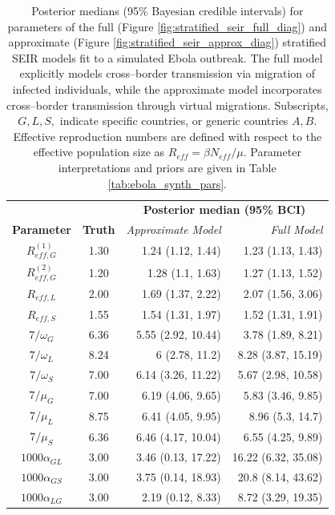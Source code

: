 \begin{table}[htbp]
	\caption[Posterior parameter estimates for full and approximate stratified SEIR models fit to a simulated Ebola outbreak.]{Posterior medians (95\% Bayesian credible intervals) for parameters of the full (Figure \ref{fig:stratified_seir_full_diag}) and approximate (Figure \ref{fig:stratified_seir_approx_diag}) stratified SEIR models fit to a simulated Ebola outbreak. The full model explicitly models cross--border transmission via migration of infected individuals, while the approximate model incorporates cross--border transmission through virtual migrations. Subscripts, $ G,L,S, $ indicate specific countries, or generic countries $ A,B $. Effective reproduction numbers are defined with respect to the effective population size as $ R_{eff} = \beta N_{eff} /\mu $. Parameter interpretations and priors are given in Table \ref{tab:ebola_synth_pars}.}
	\label{tab:ebola_synth_ests}
	\centering\footnotesize
	\begin{tabular}{ccrr}		
		\hline
		& & \multicolumn{2}{c}{\textbf{Posterior median (95\% BCI)}}\\\cline{3-4}
		\textbf{Parameter} & \textbf{Truth} & \textit{Approximate Model} & \textit{Full Model} \\ 
		\hline
		$ R_{eff,G}^{(1)} $& 1.30 & 1.24 (1.12, 1.44) & 1.23 (1.13, 1.43) \\ 
		$ R_{eff,G}^{(2)} $& 1.20 & 1.28 (1.1, 1.63)& 1.27 (1.13, 1.52) \\ 
		$ R_{eff,L} $& 2.00 & 1.69 (1.37, 2.22) & 2.07 (1.56, 3.06)  \\ 
		$ R_{eff,S} $& 1.55 & 1.54 (1.31, 1.97)& 1.52 (1.31, 1.91) \\ 
		$ 7/\omega_G $& 6.36 & 5.55 (2.92, 10.44)& 3.78 (1.89, 8.21)  \\ 
		$ 7/\omega_L $& 8.24 & 6 (2.78, 11.2)&  8.28 (3.87, 15.19) \\ 
		$ 7/\omega_S $& 7.00 & 6.14 (3.26, 11.22)& 5.67 (2.98, 10.58) \\ 
		$ 7/\mu_G $& 7.00 & 6.19 (4.06, 9.65)& 5.83 (3.46, 9.85) \\ 
		$ 7/\mu_L $ & 8.75 & 6.41 (4.05, 9.95) & 8.96 (5.3, 14.7) \\
		$ 7/\mu_S $& 6.36 & 6.46 (4.17, 10.04)& 6.55 (4.25, 9.89) \\ 
		$ 1000\alpha_{GL} $& 3.00 & 3.46 (0.13, 17.22) & 16.22 (6.32, 35.08) \\ 
		$ 1000\alpha_{GS} $& 3.00 & 3.75 (0.14, 18.93)& 20.8 (8.14, 43.62) \\ 
		$ 1000\alpha_{LG} $& 3.00 & 2.19 (0.12, 8.33)&  8.72 (3.29, 19.35) \\ 

\end{tabular}
\end{table}
